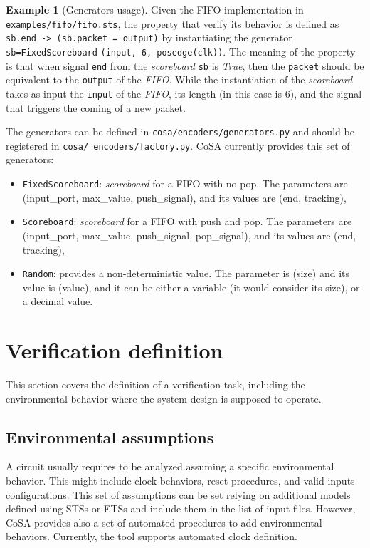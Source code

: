 \documentclass{article}
\theoremstyle{definition}
\newtheorem{example}{Example}[section]
\begin{document}
\begin{example}[Generators usage]
  Given the FIFO implementation in \texttt{examples/fifo/fifo.sts},
  the property that verify its behavior is defined as \texttt{sb.end
    -> (sb.packet = output)} by instantiating the generator
  \texttt{sb=FixedScoreboard} \texttt{(input, 6, posedge(clk))}. The meaning of
  the property is that when signal \texttt{end} from the
  \emph{scoreboard} \texttt{sb} is \emph{True}, then the
  \texttt{packet} should be equivalent to the \texttt{output} of the
  \emph{FIFO}. While the instantiation of the \emph{scoreboard} takes
  as input the \texttt{input} of the \emph{FIFO}, its length (in this
  case is 6), and the signal that triggers the coming of a new packet.
\end{example}

The generators can be defined in \texttt{cosa/encoders/generators.py}
and should be registered in \texttt{cosa/
  encoders/factory.py}. CoSA
currently provides this set of generators:

\begin{itemize}
\item \texttt{FixedScoreboard}: \emph{scoreboard} for a FIFO with no
  pop. The parameters are (input\_port, max\_value, push\_signal), and
  its values are (end, tracking),
\item \texttt{Scoreboard}: \emph{scoreboard} for a FIFO with push and
  pop. The parameters are (input\_port, max\_value, push\_signal,
  pop\_signal), and its values are (end, tracking),
\item \texttt{Random}: provides a non-deterministic value. The
  parameter is (size) and its value is (value), and it can be either a
  variable (it would consider its size), or a decimal value.
\end{itemize}  

\section{Verification definition}
\label{sec:problem_definition}

This section covers the definition of a verification task, including
the environmental behavior where the system design is supposed to
operate.

\subsection{Environmental assumptions}

A circuit usually requires to be analyzed assuming a specific
environmental behavior. This might include clock behaviors, reset
procedures, and valid inputs configurations. This set of assumptions
can be set relying on additional models defined using STSs or ETSs and
include them in the list of input files. However, CoSA provides also a
set of automated procedures to add environmental behaviors. Currently,
the tool supports automated clock definition.
\end{document}
